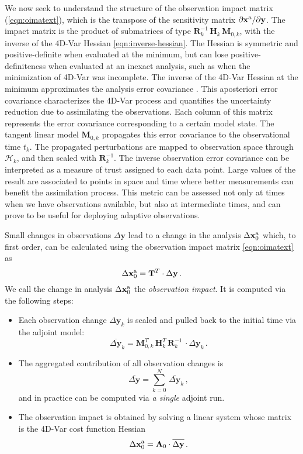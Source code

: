 \documentclass[final,sort&compress]{elsarticle}
\newcommand{\T}{\mathbf{T}}
\newcommand{\M}{\mathbf{M}}
\newcommand{\HH}{\mathbf H}
\newcommand{\A}{\mathbf{A}}
\newcommand{\R}{\mathbf{R}}
\newcommand{\xa}{ \mathbf{x}^{\rm a} }
\newcommand{\y}{ \mathbf{y} }
\renewcommand{\H}{\mathcal{H}}
\begin{document}
We now seek to understand the structure of the observation impact matrix (\ref{eqn:oimatext}), 
which is the transpose of the sensitivity matrix $\partial \xa/\partial \y$.
The impact matrix is the product of submatrices of type $\R_k^{-1}\, \HH_k\, \M_{0,k}$, with
the inverse of the 4D-Var Hessian \eqref{eqn:inverse-hessian}. 
The Hessian is symmetric and positive-definite when evaluated at the minimum, but can
lose positive-definiteness when evaluated at an inexact analysis, such as when the minimization of 4D-Var
was incomplete. The inverse of the 4D-Var Hessian at the minimum approximates the analysis error covariance \cite{gejadze2008analysis}.
This aposteriori error covariance characterizes the 4D-Var process and quantifies the uncertainty reduction due to assimilating the observations. 
Each column of this matrix represents the error covariance corresponding to a certain model state. 
The tangent linear model $\M_{0,k}$ propagates this error covariance to the observational time $t_k$.
The propagated perturbations are mapped to observation space through $\H_k$, and then scaled with $\R_k^{-1}$. 
The inverse observation error covariance can be interpreted as a measure of trust assigned to each data point.
Large values of the result are associated to points in space and time where better measurements can benefit the assimilation process. 
This metric can be assessed not only at times when we have observations available, but also
at intermediate times, and can prove to be useful for deploying adaptive observations.

Small changes in observations $\Delta\y$ lead to a change in the analysis $\Delta \xa_0$ which, to first order, can be calculated using the observation impact matrix \eqref{eqn:oimatext} as
\begin{equation}
\label{eqn:T-mapping}
\Delta \xa_0 = \T^T \cdot \Delta \y\,.
\end{equation}
We call the change in analysis $\Delta \xa_0$ the {\em observation impact}.  It is computed via the following steps:
\begin{itemize}
\item Each observation change $\Delta\y_k$ is scaled and pulled back to the initial time via the adjoint model:
\[
  \overline{\Delta \y}_k =\M_{0,k}^T\, \HH_k^T\,  \R_k^{-1}\, \cdot \Delta \y_k\,.
\]
\item The aggregated contribution of all observation changes is
\[
  \overline{\Delta \y} = \sum_{k=0}^N\, \overline{\Delta \y}_k\,,
\]
and in practice can be computed via {\em a single} adjoint run.
\item The observation impact is obtained by solving a linear system whose matrix is the 4D-Var cost function Hessian
\[
\Delta \xa_0 = \A_0 \cdot \overline{\Delta \y} \,.
\]
\end{itemize}
\end{document}
